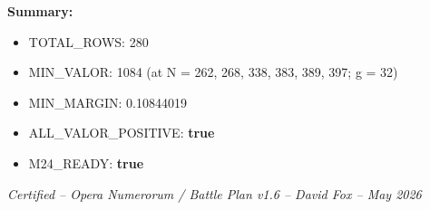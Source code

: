 \documentclass[10pt]{article}
\begin{document}
\bigskip
\noindent\textbf{Summary:}
\begin{itemize}
  \item TOTAL\_ROWS: 280
  \item MIN\_VALOR: 1084 \quad (at N = 262, 268, 338, 383, 389, 397; g = 32)
  \item MIN\_MARGIN: 0.10844019
  \item ALL\_VALOR\_POSITIVE: \textbf{true}
  \item M24\_READY: \textbf{true}
\end{itemize}

\noindent\textit{Certified -- Opera Numerorum / Battle Plan v1.6 -- David Fox -- May 2026}
\end{document}

